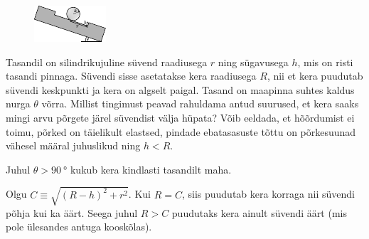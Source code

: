 
\begin{figure}
\vspace{-1em}
  \begin{center}
    \includegraphics[width=1\linewidth]{2023-v2g-08-yl.pdf}
  \end{center}
  \vspace{-2em}
\end{figure}

Tasandil on silindrikujuline süvend raadiusega $r$ ning sügavusega $h$, mis on risti tasandi pinnaga. Süvendi sisse asetatakse kera raadiusega $R$, nii et kera puudutab süvendi keskpunkti ja kera on algselt paigal. Tasand on maapinna suhtes kaldus nurga $\theta$ võrra. Millist tingimust peavad rahuldama antud suurused, et kera saaks mingi arvu põrgete järel süvendist välja hüpata? Võib eeldada, et hõõrdumist ei toimu, põrked on täielikult elastsed, pindade ebatasasuste tõttu on põrkesuunad vähesel määral juhuslikud ning $h < R$.


\hint

\solu
Juhul $\theta > \SI{90}{\degree}$ kukub kera kindlasti tasandilt maha.

Olgu $C \equiv \sqrt{(R - h)^2 + r^2}$. Kui $R = C$, siis puudutab kera korraga nii süvendi põhja kui ka äärt. Seega juhul $R > C$ puudutaks kera ainult süvendi äärt (mis pole ülesandes antuga kooskõlas).

